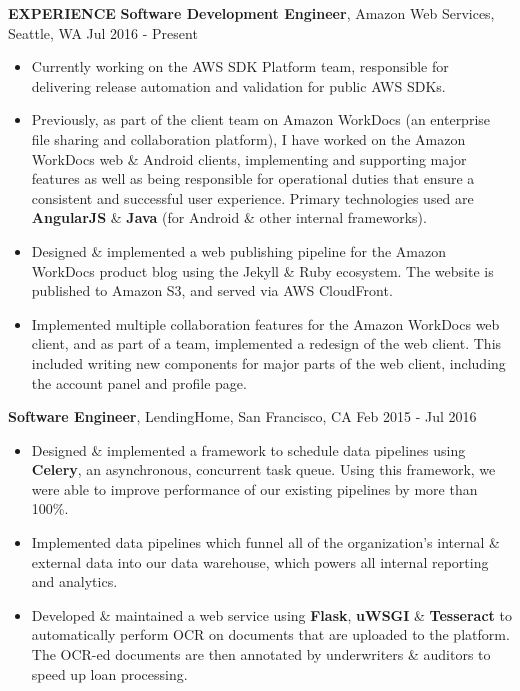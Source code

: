 \documentclass[10pt, letterpaper]{article}
\begin{document}
\textbf{EXPERIENCE}
\smallskip
\newline
\textbf{Software Development Engineer}, Amazon Web Services, Seattle, WA \hfill Jul 2016 - Present
\begin{itemize}
    \item Currently working on the AWS SDK Platform team, responsible for delivering release automation and validation for public AWS SDKs.
    \item Previously, as part of the client team on Amazon WorkDocs (an enterprise file sharing and collaboration platform), I have worked on
  the Amazon WorkDocs web \& Android clients, implementing and supporting major features as well as being responsible for operational duties that ensure
  a consistent and successful user experience. Primary technologies used are \textbf{AngularJS} \& \textbf{Java} (for Android \& other internal frameworks). 
    \item Designed \& implemented a web publishing pipeline for the Amazon WorkDocs product blog using the Jekyll \& Ruby ecosystem. The website is
  published to Amazon S3, and served via AWS CloudFront.
    \item Implemented multiple collaboration features for the Amazon WorkDocs web client, and as part of a team, implemented a redesign of
  the web client. This included writing new components for major parts of the web client, including the account panel and profile page.
\end{itemize}
\textbf{Software Engineer}, LendingHome, San Francisco, CA \hfill Feb 2015 - Jul 2016
\begin{itemize}
    \item Designed \& implemented a framework to schedule data pipelines using \textbf{Celery}, an asynchronous, concurrent task queue.
  Using this framework, we were able to improve performance of our existing pipelines by more than 100\%.
    \item Implemented data pipelines which funnel all of the organization's internal \& external data into our data warehouse,
  which powers all internal reporting and analytics.
    \item Developed \& maintained a web service using \textbf{Flask}, \textbf{uWSGI} \& \textbf{Tesseract} to automatically perform OCR on documents
  that are uploaded to the platform. The OCR-ed documents are then annotated by underwriters \& auditors to speed up loan processing.
\end{itemize}
\end{document}
